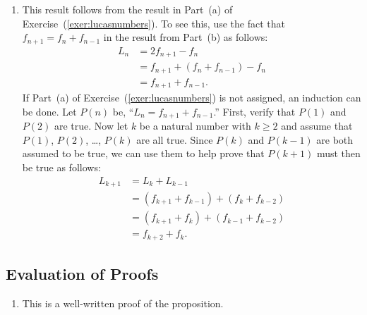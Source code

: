 \begin{enumerate}
\begin{enumerate}
\item This result follows from the result in Part~(a) of Exercise~(\ref{exer:lucasnumbers}).  To see this, use the fact that 
$f_{n+1} = f_{n} + f_{n-1}$ in the result from Part~(b) as follows:
\begin{align*}
L_n &= 2f_{n+1} - f_n \\
    &= f_{n+1} + \left( f_n + f_{n-1} \right) - f_n \\
    &= f_{n+1} + f_{n-1}.
\end{align*}
If Part~(a) of Exercise~(\ref{exer:lucasnumbers}) is not assigned, an induction can be done.  Let $P(n)$ be, 
``$L_n = f_{n+1} + f_{n-1}$.''  First, verify that $P(1)$ and $P(2)$ are true.  Now let 
$k$ be a natural number with $k \geq 2$ and assume that $P(1)$, $P(2)$, \ldots, 
$P(k)$ are all true. Since $P(k)$ and $P(k-1)$ are both assumed to be true, we can use them to help prove that $P(k+1)$ must then be true as follows:
\begin{align*}
L_{k+1} &= L_k + L_{k-1} \\
        &= \left( f_{k+1} + f_{k - 1} \right) + \left( f_k + f_{k-2} \right) \\
        &= \left( f_{k+1} + f_k \right) + \left( f_{k-1} + f_{k-2} \right) \\
        &= f_{k+2} + f_k.
\end{align*}
\end{enumerate}
\end{enumerate}



\subsection*{Evaluation of Proofs}
\setcounter{oldenumi}{\theenumi}
\begin{enumerate} \setcounter{enumi}{\theoldenumi}
\item This is a well-written proof of the proposition.
\end{enumerate}


